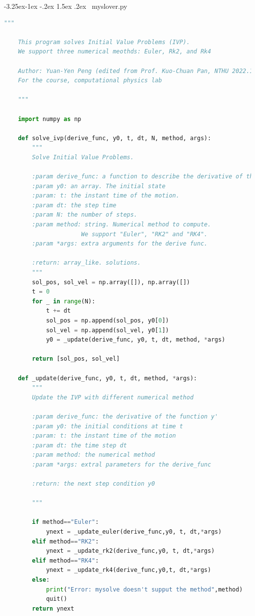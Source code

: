 \documentclass[12pt]{article}
\makeatletter
\renewcommand\subsection{\leftskip 0pt\@startsection{subsection}{2}{\z@}%
                                      {-3.25ex\@plus -1ex \@minus -.2ex}%
                                      {1.5ex \@plus .2ex}%
                                      {\normalfont\large\bfseries}}
\makeatother
\begin{document}
    \subsection{{\ttfamily\ myslover.py}}
      \begin{lstlisting}[language={Python}]
    """

    This program solves Initial Value Problems (IVP).
    We support three numerical meothds: Euler, Rk2, and Rk4

    Author: Yuan-Yen Peng (edited from Prof. Kuo-Chuan Pan, NTHU 2022.10.06)
    For the course, computational physics lab

    """

    import numpy as np

    def solve_ivp(derive_func, y0, t, dt, N, method, args):
        """
        Solve Initial Value Problems. 

        :param derive_func: a function to describe the derivative of the desired function
        :param y0: an array. The initial state
        :param: t: the instant time of the motion.
        :param dt: the step time
        :param N: the number of steps.
        :param method: string. Numerical method to compute. 
                      We support "Euler", "RK2" and "RK4".
        :param *args: extra arguments for the derive func.

        :return: array_like. solutions. 
        """
        sol_pos, sol_vel = np.array([]), np.array([])
        t = 0
        for _ in range(N):
            t += dt
            sol_pos = np.append(sol_pos, y0[0])
            sol_vel = np.append(sol_vel, y0[1]) 
            y0 = _update(derive_func, y0, t, dt, method, *args)

        return [sol_pos, sol_vel]

    def _update(derive_func, y0, t, dt, method, *args):
        """
        Update the IVP with different numerical method

        :param derive_func: the derivative of the function y'
        :param y0: the initial conditions at time t
        :param: t: the instant time of the motion
        :param dt: the time step dt
        :param method: the numerical method
        :param *args: extral parameters for the derive_func

        :return: the next step condition y0

        """

        if method=="Euler":
            ynext = _update_euler(derive_func,y0, t, dt,*args)
        elif method=="RK2":
            ynext = _update_rk2(derive_func,y0, t, dt,*args)
        elif method=="RK4":
            ynext = _update_rk4(derive_func,y0,t, dt,*args)
        else:
            print("Error: mysolve doesn't supput the method",method)
            quit()
        return ynext


\end{lstlisting}
\end{document}
